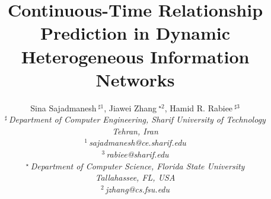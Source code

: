 \documentclass[10pt,conference,letterpaper]{IEEEtran}
\title{Continuous-Time Relationship Prediction in Dynamic Heterogeneous Information Networks}
\author{%
{Sina Sajadmanesh{\small $~^{\sharp1}$}, Jiawei Zhang{\small $~^{\star2}$}, Hamid R. Rabiee{\small $~^{\sharp3}$} }%
\vspace{1.6mm}\\
\fontsize{10}{10}\selectfont\itshape
$^{\sharp}$\,Department of Computer Engineering, Sharif University of Technology\\
Tehran, Iran\\
\fontsize{9}{9}\selectfont\ttfamily\upshape
%
$^{1}$\,sajadmanesh@ce.sharif.edu\\
$^{3}$\,rabiee@sharif.edu%
\vspace{1.2mm}\\
\fontsize{10}{10}\selectfont\rmfamily\itshape
$^{\star}$\,Department of Computer Science, Florida State University\\
Tallahassee, FL, USA\\
\fontsize{9}{9}\selectfont\ttfamily\upshape
$^{2}$\,jzhang@cs.fsu.edu
}
\begin{document}
\maketitle
%
\newtheorem{definition}{Definition}
\newcommand{\descr}[1]{\smallskip\noindent\textbf{#1}}
\newcommand{\npglm}{{\textsc{Np-Glm}}\xspace}
\newcommand{\mb}[1]{\mathbf{#1}}
\newcommand{\mc}[1]{\mathcal{#1}}
\newcommand\xrsquigarrow[1]{%
	\stepcounter{sarrow}%
	\begin{tikzpicture}[decoration=snake]
	\node (\thesarrow) {\strut#1};
	\draw[->,decorate] (\thesarrow.south west) -- (\thesarrow.south east);
	\end{tikzpicture}%
}









%
%


\balance

\end{document}
